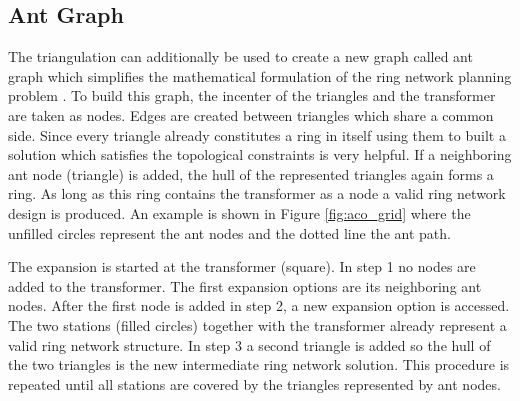 \subsection{Ant Graph}\label{ant_graph}
The triangulation can additionally be used to create a new graph called ant graph which simplifies the mathematical formulation of the ring network planning problem \cite{rotering2013zielnetzplanung}. To build this graph, the incenter of the triangles and the transformer are taken as nodes. Edges are created between triangles which share a common side. Since every triangle already constitutes a ring in itself using them to built a solution which satisfies the topological constraints is very helpful. If a neighboring ant node (triangle) is added, the hull of the represented triangles again forms a ring. As long as this ring contains the transformer as a node a valid ring network design is produced. An example is shown in Figure \ref{fig:aco_grid} where the unfilled circles represent the ant nodes and the dotted line the ant path.


The expansion is started at the transformer (square). In step 1 no nodes are added to the transformer. The first expansion options are its neighboring ant nodes. After the first node is added in step 2, a new expansion option is accessed. The two stations (filled circles) together with the transformer already represent a valid ring network structure. In step 3 a second triangle is added so the hull of the two triangles is the new intermediate ring network solution. This procedure is repeated until all stations are covered by the triangles represented by ant nodes.





